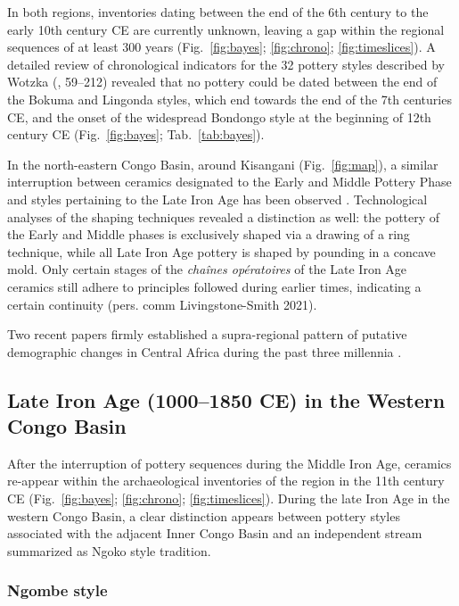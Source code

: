 \documentclass[smallextended,natbib]{svjour3}       %
\begin{document}
In both regions, inventories dating between the end of the 6th century to the early 10th century CE are currently unknown, leaving a gap within the regional sequences of at least 300 years (Fig.~\ref{fig:bayes}; \ref{fig:chrono}; \ref{fig:timeslices}). A detailed review of chronological indicators for the 32 pottery styles described by Wotzka (\citeyear{Wotzka.1995}, 59--212) revealed that no pottery could be dated between the end of the Bokuma and Lingonda styles, which end towards the end of the 7th centuries CE, and the onset of the widespread Bondongo style at the beginning of 12th century CE (Fig.~\ref{fig:bayes}; Tab.~\ref{tab:bayes}).

In the north-eastern Congo Basin, around Kisangani (Fig.~\ref{fig:map}), a similar interruption between ceramics designated to the Early and Middle Pottery Phase and styles pertaining to the Late Iron Age has been observed \citep[Fig.~\ref{fig:bayes}; \ref{fig:chrono};]{LivingstoneSmith.2017}. Technological analyses of the shaping techniques revealed a distinction as well: the pottery of the Early and Middle phases is exclusively shaped via a drawing of a ring technique, while all Late Iron Age pottery is shaped by pounding in a concave mold. Only certain stages of the \textit{chaînes opératoires} of the Late Iron Age ceramics still adhere to principles followed during earlier times, indicating a certain continuity (pers. comm Livingstone-Smith 2021).

Two recent papers firmly established a supra-regional pattern of putative demographic changes in Central Africa during the past three millennia \citep{deSaulieu.2021a,Seidensticker.2021}.

\subsection*{Late Iron Age (1000--1850 CE) in the Western Congo Basin}

After the interruption of pottery sequences during the Middle Iron Age, ceramics re-appear within the archaeological inventories of the region in the 11th century CE (Fig.~\ref{fig:bayes}; \ref{fig:chrono}; \ref{fig:timeslices}). During the late Iron Age in the western Congo Basin, a clear distinction appears between pottery styles associated with the adjacent Inner Congo Basin and an independent stream summarized as Ngoko style tradition.

\subsubsection*{Ngombe style}
\end{document}
